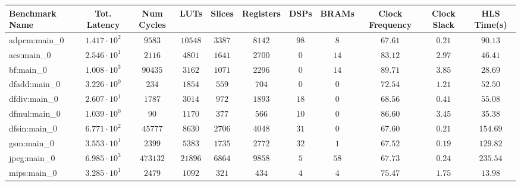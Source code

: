 \begin{tabular}{|l|c|c|c|c|c|c|c|c|c|c|}
\hline
Benchmark Name      & Tot. Latency           & Num Cycles & LUTs      & Slices    & Registers & DSPs    & BRAMs   & Clock Frequency & Clock Slack & HLS Time(s) \\
\hline
adpcm:main\_0       & $ 1.417 \cdot 10^{2} $ & $ 9583   $ & $ 10548 $ & $ 3387  $ & $ 8142  $ & $ 98  $ & $ 8   $ & $ 67.61       $ & $ 0.21    $ & $ 90.13   $ \\
aes:main\_0         & $ 2.546 \cdot 10^{1} $ & $ 2116   $ & $ 4801  $ & $ 1641  $ & $ 2700  $ & $ 0   $ & $ 14  $ & $ 83.12       $ & $ 2.97    $ & $ 46.41   $ \\
bf:main\_0          & $ 1.008 \cdot 10^{3} $ & $ 90435  $ & $ 3162  $ & $ 1071  $ & $ 2296  $ & $ 0   $ & $ 14  $ & $ 89.71       $ & $ 3.85    $ & $ 28.69   $ \\
dfadd:main\_0       & $ 3.226 \cdot 10^{0} $ & $ 234    $ & $ 1854  $ & $ 559   $ & $ 704   $ & $ 0   $ & $ 0   $ & $ 72.54       $ & $ 1.21    $ & $ 52.50   $ \\
dfdiv:main\_0       & $ 2.607 \cdot 10^{1} $ & $ 1787   $ & $ 3014  $ & $ 972   $ & $ 1893  $ & $ 18  $ & $ 0   $ & $ 68.56       $ & $ 0.41    $ & $ 55.08   $ \\
dfmul:main\_0       & $ 1.039 \cdot 10^{0} $ & $ 90     $ & $ 1170  $ & $ 377   $ & $ 566   $ & $ 10  $ & $ 0   $ & $ 86.60       $ & $ 3.45    $ & $ 35.38   $ \\
dfsin:main\_0       & $ 6.771 \cdot 10^{2} $ & $ 45777  $ & $ 8630  $ & $ 2706  $ & $ 4048  $ & $ 31  $ & $ 0   $ & $ 67.60       $ & $ 0.21    $ & $ 154.69  $ \\
gsm:main\_0         & $ 3.553 \cdot 10^{1} $ & $ 2399   $ & $ 5383  $ & $ 1735  $ & $ 2772  $ & $ 32  $ & $ 1   $ & $ 67.52       $ & $ 0.19    $ & $ 129.82  $ \\
jpeg:main\_0        & $ 6.985 \cdot 10^{3} $ & $ 473132 $ & $ 21896 $ & $ 6864  $ & $ 9858  $ & $ 5   $ & $ 58  $ & $ 67.73       $ & $ 0.24    $ & $ 235.54  $ \\
mips:main\_0        & $ 3.285 \cdot 10^{1} $ & $ 2479   $ & $ 1092  $ & $ 321   $ & $ 434   $ & $ 4   $ & $ 4   $ & $ 75.47       $ & $ 1.75    $ & $ 13.98   $ \\

\end{tabular}
